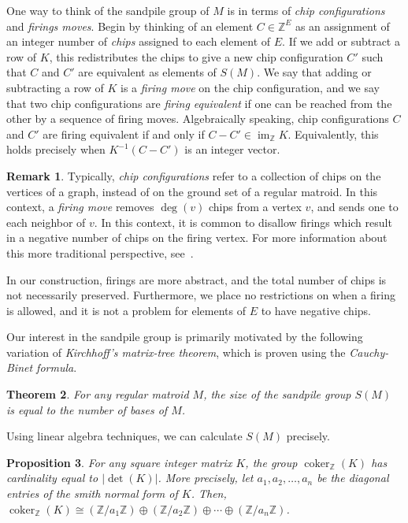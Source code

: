 \documentclass[12p]{amsart}
\numberwithin{equation}{section}
\theoremstyle{plain}
\newtheorem{thm}{Theorem}[section]
\newtheorem{prop}[thm]{Proposition}
\theoremstyle{definition}
\newtheorem{remark}[thm]{Remark}
\newcommand{\Z}{\mathbb {Z}}
\DeclareMathOperator{\im}{im}
\DeclareMathOperator{\coker}{coker}
\begin{document}
One way to think of the sandpile group of $M$ is in terms of \emph{chip configurations} and \emph{firings moves}. Begin by thinking of an element $C \in \Z^E$ as an assignment of an integer number of \emph{chips} assigned to each element of $E$. If we add or subtract a row of $K$, this redistributes the chips to give a new chip configuration $C'$ such that $C$ and $C'$ are equivalent as elements of $S(M)$. We say that adding or subtracting a row of $K$ is a \emph{firing move} on the chip configuration, and we say that two chip configurations are \emph{firing equivalent} if one can be reached from the other by a sequence of firing moves. Algebraically speaking, chip configurations $C$ and $C'$ are firing equivalent if and only if $C - C' \in \im_{\Z} K$. Equivalently, this holds precisely when $K^{-1}(C-C')$ is an integer vector. 

\begin{remark}
    Typically, \emph{chip configurations} refer to a collection of chips on the vertices of a graph, instead of on the ground set of a regular matroid. In this context, a \emph{firing move} removes $\deg(v)$ chips from a vertex $v$, and sends one to each neighbor of $v$. In this context, it is common to disallow firings which result in a negative number of chips on the firing vertex. For more information about this more traditional perspective, see~\cite{Klivans}. 
    
    In our construction, firings are more abstract, and the total number of chips is not necessarily preserved. Furthermore, we place no restrictions on when a firing is allowed, and it is not a problem for elements of $E$ to have negative chips. 
\end{remark}

Our interest in the sandpile group is primarily motivated by the following variation of \emph{Kirchhoff's matrix-tree theorem}, which is proven using the \emph{Cauchy-Binet formula}. 

\begin{thm}\cite[Theorem 3.3.2]{Merino} For any regular matroid $M$, the size of the sandpile group $S(M)$ is equal to the number of bases of $M$.
\end{thm}

Using linear algebra techniques, we can calculate $S(M)$ precisely. 

\begin{prop}\cite[Section 8]{Biggs99}\label{prop:smith_normal}
    For any square integer matrix $K$, the group $\coker_{\Z}(K)$ has cardinality equal to $|\det(K)|$. More precisely, let $a_1,a_2, \dots, a_n$ be the diagonal entries of the \emph{smith normal form} of $K$. Then, $\coker_{\Z}(K) \cong (\Z/{a_1}\Z) \oplus (\Z/{a_2}\Z) \oplus \cdots \oplus (\Z/{a_n}\Z)$.
\end{prop} 
\end{document}
